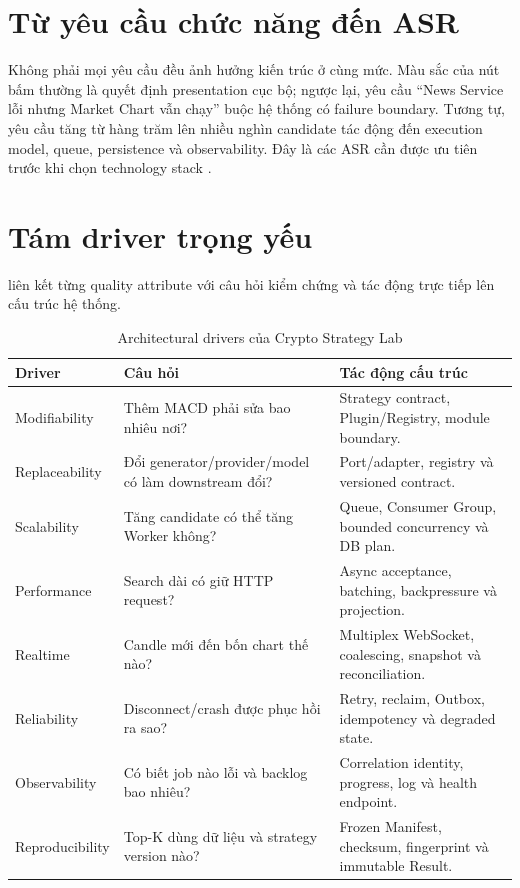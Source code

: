 \documentclass[12pt,a4paper,oneside]{report}
\begin{document}
\section{Từ yêu cầu chức năng đến ASR}

Không phải mọi yêu cầu đều ảnh hưởng kiến trúc ở cùng mức. Màu sắc của nút bấm thường là quyết định presentation cục bộ; ngược lại, yêu cầu ``News Service lỗi nhưng Market Chart vẫn chạy'' buộc hệ thống có failure boundary. Tương tự, yêu cầu tăng từ hàng trăm lên nhiều nghìn candidate tác động đến execution model, queue, persistence và observability. Đây là các ASR cần được ưu tiên trước khi chọn technology stack \cite{bass2021,cervantes2016}.

\section{Tám driver trọng yếu}

 liên kết từng quality attribute với câu hỏi kiểm chứng và tác động trực tiếp lên cấu trúc hệ thống.

\begin{table}[H]
  \centering
  \caption{Architectural drivers của Crypto Strategy Lab}
  \label{tab:drivers}
  \small
  \begin{tabularx}{\textwidth}{L{3.1cm}YL{5.2cm}}
    \toprule
    \textbf{Driver} & \textbf{Câu hỏi} & \textbf{Tác động cấu trúc} \\
    \midrule
    Modifiability & Thêm MACD phải sửa bao nhiêu nơi? & Strategy contract, Plugin/Registry, module boundary. \\
    Replaceability & Đổi generator/provider/model có làm downstream đổi? & Port/adapter, registry và versioned contract. \\
    Scalability & Tăng candidate có thể tăng Worker không? & Queue, Consumer Group, bounded concurrency và DB plan. \\
    Performance & Search dài có giữ HTTP request? & Async acceptance, batching, backpressure và projection. \\
    Realtime & Candle mới đến bốn chart thế nào? & Multiplex WebSocket, coalescing, snapshot và reconciliation. \\
    Reliability & Disconnect/crash được phục hồi ra sao? & Retry, reclaim, Outbox, idempotency và degraded state. \\
    Observability & Có biết job nào lỗi và backlog bao nhiêu? & Correlation identity, progress, log và health endpoint. \\
    Reproducibility & Top-K dùng dữ liệu và strategy version nào? & Frozen Manifest, checksum, fingerprint và immutable Result. \\
    \bottomrule
  \end{tabularx}
\end{table}
\end{document}
